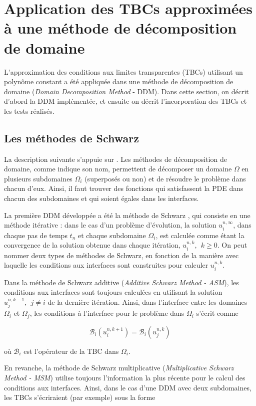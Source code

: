 \section{Application des TBCs approximées à une méthode de décomposition de domaine}
\label{sec:DDM}

\indent L'approximation des conditions aux limites transparentes (TBCs) utilisant un polynôme constant a été appliquée dans une méthode de décomposition de domaine (\emph{Domain Decomposition Method} - DDM). Dans cette section, on décrit d'abord la DDM implémentée, et ensuite on décrit l'incorporation des TBCs et les tests réalisés.

\subsection{Les méthodes de Schwarz}

\indent La description suivante s’appuie sur \cite{Japhet2003}. Les méthodes de décomposition de domaine, comme indique son nom, permettent de décomposer un domaine $\Omega$ en plusieurs subdomaines $\Omega_i$ (superposés ou non) et de résoudre le problème dans chacun d'eux. Ainsi, il faut trouver des fonctions qui satisfassent la PDE dans chacun des subdomaines et qui soient égales dans les interfaces.

\indent La première DDM développée a été la méthode de Schwarz \cite{Japhet2003,Gander2008}, qui consiste en une méthode itérative : dans le cas d'un problème d'évolution, la solution $u_i^{n,\infty}$, dans chaque pas de temps $t_n$ et chaque subdomaine $\Omega_i$, est calculée comme étant la convergence de la solution obtenue dans chaque itération, $u_i^{n,k}, \ \ k\geq 0$. On peut nommer deux types de méthodes de Schwarz, en fonction de la manière avec laquelle les conditions aux interfaces sont construites pour calculer $u_i^{n,k}$.

\indent Dans la méthode de Schwarz additive (\emph{Additive Schwarz Method - ASM}), les conditions aux interfaces sont toujours calculées en utilisant la solution $u_j^{n,k-1}, \ \ j \neq i$ de la dernière itération. Ainsi, dans l'interface entre les domaines $\Omega_i$ et $\Omega_j$, les conditions à l'interface pour le problème dans $\Omega_i$ s'écrit comme

$$\mathcal{B}_i(u_i^{n,k+1}) = \mathcal{B}_i(u_j^{n,k})$$

\noindent où $\mathcal{B}_i$ est l'opérateur de la TBC dans $\Omega_i$.

\indent En revanche, la méthode de Schwarz multiplicative (\emph{Multiplicative Schwarz Method - MSM}) utilise toujours l'information la plus récente pour le calcul des conditions aux interfaces. Ainsi, dans le cas d'une DDM avec deux subdomaines, les TBCs s'écriraient (par exemple) sous la forme

